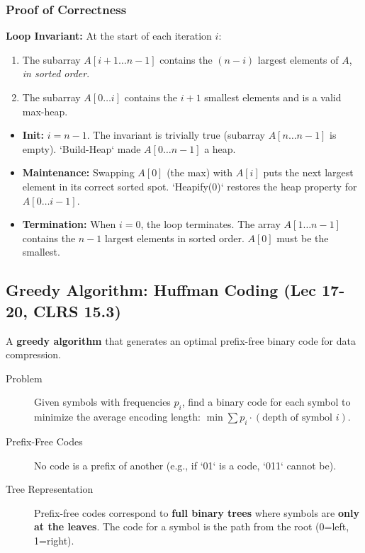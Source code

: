\subsubsection{Proof of Correctness}
\textbf{Loop Invariant:} At the start of each iteration $i$:
\begin{enumerate}
    \item The subarray $A[i+1 \dots n-1]$ contains the $(n-i)$ largest elements of $A$, \textit{in sorted order}.
    \item The subarray $A[0 \dots i]$ contains the $i+1$ smallest elements and is a valid max-heap.
\end{enumerate}
\begin{itemize}
    \item \textbf{Init:} $i=n-1$. The invariant is trivially true (subarray $A[n \dots n-1]$ is empty). `Build-Heap` made $A[0 \dots n-1]$ a heap.
    \item \textbf{Maintenance:} Swapping $A[0]$ (the max) with $A[i]$ puts the next largest element in its correct sorted spot. `Heapify(0)` restores the heap property for $A[0 \dots i-1]$.
    \item \textbf{Termination:} When $i=0$, the loop terminates. The array $A[1 \dots n-1]$ contains the $n-1$ largest elements in sorted order. $A[0]$ must be the smallest.
\end{itemize}


\subsection{Greedy Algorithm: Huffman Coding (Lec 17-20, CLRS 15.3)}
A \textbf{greedy algorithm} that generates an optimal prefix-free binary code for data compression.
\begin{description}
    \item[Problem] Given symbols with frequencies $p_i$, find a binary code for each symbol to minimize the average encoding length: $\min \sum p_i \cdot (\text{depth of symbol } i)$.
    \item[Prefix-Free Codes] No code is a prefix of another (e.g., if `01` is a code, `011` cannot be).
    \item[Tree Representation] Prefix-free codes correspond to \textbf{full binary trees} where symbols are \textbf{only at the leaves}. The code for a symbol is the path from the root (0=left, 1=right).
\end{description}

